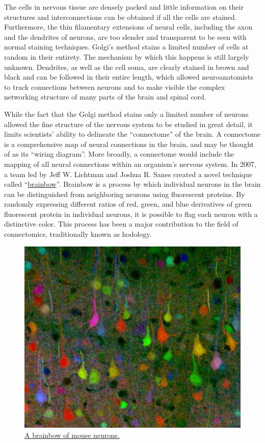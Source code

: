 The cells in nervous tissue are densely packed and little information on their structures and interconnections can be obtained if all the cells are stained. Furthermore, the thin filamentary extensions of neural cells, including the axon and the dendrites of neurons, are too slender and transparent to be seen with normal staining techniques. Golgi's method stains a limited number of cells at random in their entirety. The mechanism by which this happens is still largely unknown. Dendrites, as well as the cell soma, are clearly stained in brown and black and can be followed in their entire length, which allowed neuroanatomists to track connections between neurons and to make visible the complex networking structure of many parts of the brain and spinal cord.

While the fact that the Golgi method stains only a limited number of neurons allowed the fine structure of the nervous system to be studied in great detail, it limits scientists' ability to delineate the ``connectome'' of the brain. A connectome is a comprehensive map of neural connections in the brain, and may be thought of as its ``wiring diagram''. More broadly, a connectome would include the mapping of all neural connections within an organism's nervous system.
In 2007, a team led by Jeff W. Lichtman and Joshua R. Sanes created a novel technique called ``\href{https://en.wikipedia.org/wiki/Brainbow}{brainbow}''. Brainbow is a process by which individual neurons in the brain can be distinguished from neighboring neurons using fluorescent proteins. By randomly expressing different ratios of red, green, and blue derivatives of green fluorescent protein in individual neurons, it is possible to flag each neuron with a distinctive color. This process has been a major contribution to the field of connectomics, traditionally known as hodology.



\begin{figure}

{\centering \includegraphics[width=0.7\linewidth]{./figures/nervoussystem/nihms37882f2} 

}

\caption{\href{https://commons.wikimedia.org/wiki/File:Brainbow_(Smith_2007).jpg}{A brainbow of mouse neurons.}}\label{fig:brainbow}
\end{figure}

